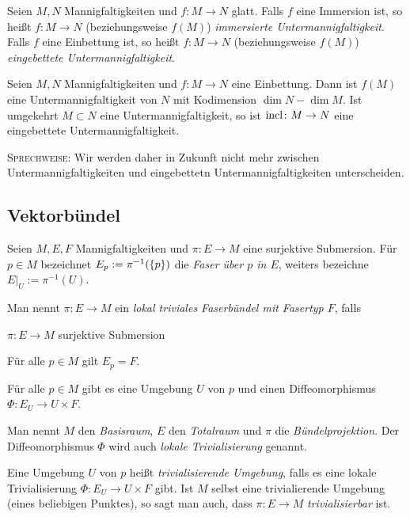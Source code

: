 \begin{definition}
  Seien $M,N$ Mannigfaltigkeiten und $f\colon M \to N$ glatt. Falls
  $f$ eine Immersion ist, so heißt $f\colon M\to N$ (beziehungsweise
  $f(M)$) \emph{immersierte Untermannigfaltigkeit}. Falls $f$ eine
  Einbettung ist, so heißt $f\colon M \to N$ (beziehungsweise $f(M)$)
  \emph{eingebettete Untermannigfaltigkeit}.
\end{definition}

\begin{proposition}
  Seien $M,N$ Mannigfaltigkeiten und $f\colon M\to N$ eine Einbettung. Dann ist
  $f(M)$ eine Untermannigfaltigkeit von $N$ mit Kodimension $\dim N -
  \dim M$. Ist umgekehrt $M\subset N$ eine Untermannigfaltigkeit, so
  ist $\operatorname{incl}\colon M \to N$ eine eingebettete Untermannigfaltigkeit.

  \textsc{Sprechweise:} Wir werden daher in Zukunft nicht mehr
  zwischen Untermannigfaltigkeiten und eingebettetn
  Untermannigfaltigkeiten unterscheiden.
\end{proposition}

\subsection{Vektorbündel}
\label{sec:vb}

\begin{definition}
  Seien $M,E,F$ Mannigfaltigkeiten und $\pi\colon E\to M$ eine
  surjektive Submersion. Für $p\in M$ bezeichnet $E_p :=
  \pi^{-1}(\left\lbrace p \right\rbrace)$ die \emph{Faser über $p$ in $E$}, weiters bezeichne
  $E|_U := \pi^{-1}(U)$.

  Man nennt $\pi\colon E\to M$ ein \emph{lokal triviales Faserbündel mit Fasertyp
    $F$}, falls
  \begin{properties}
  \item $\pi\colon E\to M$ surjektive Submersion
  \item Für alle $p\in M$ gilt $E_p = F$.
  \item Für alle $p\in M$ gibt es eine Umgebung $U$ von $p$ und einen
    Diffeomorphismus $\Phi\colon E_U \to U\times F$.
  \end{properties}
  Man nennt $M$ den \emph{Basisraum}, $E$ den \emph{Totalraum} und
  $\pi$ die \emph{Bündelprojektion}. Der Diffeomorphismus $\Phi$ wird
  auch \emph{lokale Trivialisierung} genannt.

  Eine Umgebung $U$ von $p$ heißt \emph{trivialisierende Umgebung},
  falls es eine lokale Trivialisierung $\Phi\colon E_U \to U\times F$
  gibt. Ist $M$ selbst eine trivialierende Umgebung (eines beliebigen
  Punktes), so sagt man auch, dass $\pi\colon E\to M$
  \emph{trivialisierbar} ist. 
\end{definition}

